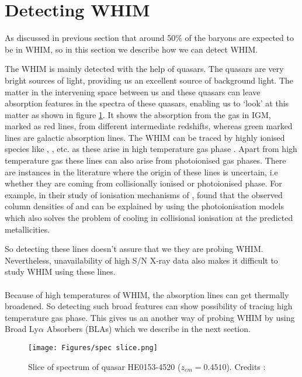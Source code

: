 \section{Detecting WHIM} \label{sec:WHIM-detection}

As discussed in previous section that around 50\% of the baryons are expected to be in WHIM, so in this section we describe how we can detect WHIM.

The WHIM is mainly detected with the help of quasars. The quasars are very bright sources of light, providing us an excellent source of background light. The matter in the intervening space between us and these quasars can leave absorption features in the spectra of these quasars, enabling us to `look' at this matter as shown in figure \ref{fig:qso-absorption}. It shows the absorption from the gas in IGM, marked as red lines, from different intermediate redshifts, whereas green marked lines are galactic absorption lines. The WHIM can be traced by highly ionised species like , , etc. as these arise in high temperature gas phase \citep{tepper-2013}. Apart from high temperature gas these lines can also arise from photoionised gas phases. There are instances in the literature where the origin of these lines is uncertain, i.e whether they are coming from collisionally ionised or photoionised phase. For example, in their study of ionisation mechanisms of , \citet{Hussain-2017} found that the observed column densities of  and  can be explained by using the photoionisation models which also solves the problem of cooling in collisional ionisation at the predicted metallicities.   

So detecting these lines doesn't assure that we they are probing WHIM. Nevertheless, unavailability of high S/N X-ray data also makes it difficult to study WHIM using these lines. 
\\\\
Because of high temperatures of WHIM, the absorption lines can get thermally broadened. So detecting such broad features can show possibility of tracing high temperature gas phase. This gives us an another way of probing WHIM by using Broad Ly$\alpha$ Absorbers (BLAs) which we describe in the next section.

\begin{figure}
    \centering
    \texttt{[image: Figures/spec slice.png]}
    \caption{Slice of spectrum of quasar HE0153-4520 ($z_{em}=0.4510$). Credits : \citet{danforth-2016}}
    \label{fig:qso-absorption}
\end{figure}


